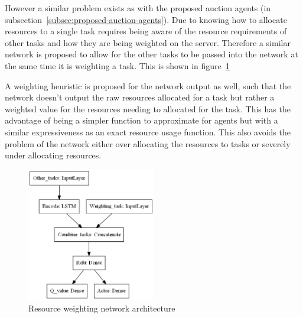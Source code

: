 However a similar problem exists as with the proposed auction agents (in subsection~\ref{subsec:proposed-auction-agents}).
Due to knowing how to allocate resources to a single task requires being aware of the resource requirements of other
tasks and how they are being weighted on the server. Therefore a similar network is proposed to allow for the other tasks
to be passed into the network at the same time it is weighting a task. This is shown in
figure~\ref{fig:resource_weighting_network_architecture}

A weighting heuristic is proposed for the network output as well, such that the network doesn't output the raw
resources allocated for a task but rather a weighted value for the resources needing to allocated for the task.
This has the advantage of being a simpler function to approximate for agents but with a similar expressiveness as an
exact resource usage function. This also avoids the problem of the network either over allocating the resources to tasks
or severely under allocating resources.

\begin{figure}
    \centering
    \includegraphics[width=0.5\textwidth]{figures/solution_fig/resource_weighting_network_architecture.png}
    \caption{Resource weighting network architecture}
    \label{fig:resource_weighting_network_architecture}
\end{figure}


